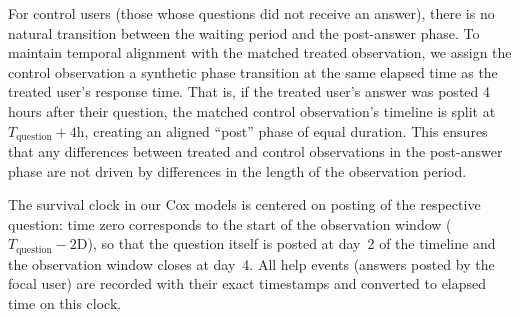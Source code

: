 For control users (those whose questions did not receive an answer), there is no natural transition between the waiting period and the post-answer phase. To maintain temporal alignment with the matched treated observation, we assign the control observation a synthetic phase transition at the same elapsed time as the treated user's response time. That is, if the treated user's answer was posted 4 hours after their question, the matched control observation's timeline is split at $T_{\text{question}} + 4\text{h}$, creating an aligned ``post'' phase of equal duration. This ensures that any differences between treated and control observations in the post-answer phase are not driven by differences in the length of the observation period.

The survival clock in our Cox models is centered on posting of the respective question: time zero corresponds to the start of the observation window ($T_{\text{question}} - 2\text{D}$), so that the question itself is posted at day~2 of the timeline and the observation window closes at day~4. All help events (answers posted by the focal user) are recorded with their exact timestamps and converted to elapsed time on this clock.


